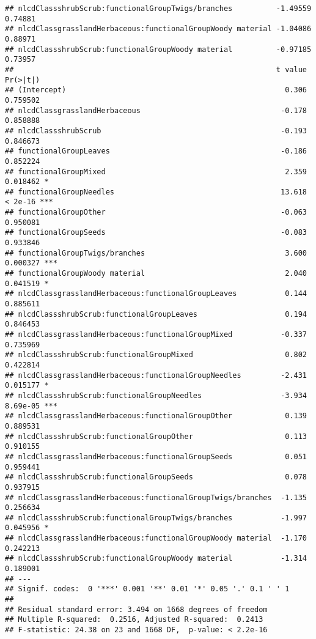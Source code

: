 \documentclass[]{article}
\begin{document}
\begin{verbatim}
## nlcdClassshrubScrub:functionalGroupTwigs/branches          -1.49559    0.74881
## nlcdClassgrasslandHerbaceous:functionalGroupWoody material -1.04086    0.88971
## nlcdClassshrubScrub:functionalGroupWoody material          -0.97185    0.73957
##                                                            t value Pr(>|t|)    
## (Intercept)                                                  0.306 0.759502    
## nlcdClassgrasslandHerbaceous                                -0.178 0.858888    
## nlcdClassshrubScrub                                         -0.193 0.846673    
## functionalGroupLeaves                                       -0.186 0.852224    
## functionalGroupMixed                                         2.359 0.018462 *  
## functionalGroupNeedles                                      13.618  < 2e-16 ***
## functionalGroupOther                                        -0.063 0.950081    
## functionalGroupSeeds                                        -0.083 0.933846    
## functionalGroupTwigs/branches                                3.600 0.000327 ***
## functionalGroupWoody material                                2.040 0.041519 *  
## nlcdClassgrasslandHerbaceous:functionalGroupLeaves           0.144 0.885611    
## nlcdClassshrubScrub:functionalGroupLeaves                    0.194 0.846453    
## nlcdClassgrasslandHerbaceous:functionalGroupMixed           -0.337 0.735969    
## nlcdClassshrubScrub:functionalGroupMixed                     0.802 0.422814    
## nlcdClassgrasslandHerbaceous:functionalGroupNeedles         -2.431 0.015177 *  
## nlcdClassshrubScrub:functionalGroupNeedles                  -3.934 8.69e-05 ***
## nlcdClassgrasslandHerbaceous:functionalGroupOther            0.139 0.889531    
## nlcdClassshrubScrub:functionalGroupOther                     0.113 0.910155    
## nlcdClassgrasslandHerbaceous:functionalGroupSeeds            0.051 0.959441    
## nlcdClassshrubScrub:functionalGroupSeeds                     0.078 0.937915    
## nlcdClassgrasslandHerbaceous:functionalGroupTwigs/branches  -1.135 0.256634    
## nlcdClassshrubScrub:functionalGroupTwigs/branches           -1.997 0.045956 *  
## nlcdClassgrasslandHerbaceous:functionalGroupWoody material  -1.170 0.242213    
## nlcdClassshrubScrub:functionalGroupWoody material           -1.314 0.189001    
## ---
## Signif. codes:  0 '***' 0.001 '**' 0.01 '*' 0.05 '.' 0.1 ' ' 1
## 
## Residual standard error: 3.494 on 1668 degrees of freedom
## Multiple R-squared:  0.2516, Adjusted R-squared:  0.2413 
## F-statistic: 24.38 on 23 and 1668 DF,  p-value: < 2.2e-16
\end{verbatim}
\end{document}
